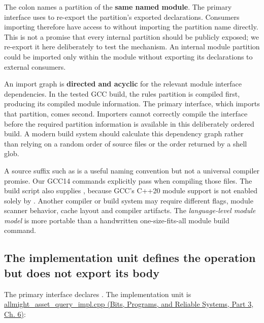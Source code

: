 The colon names a partition of the \textbf{same named module}. The primary interface uses  to re-export the partition's exported declarations. Consumers importing  therefore have access to  without importing the partition name directly. This is not a promise that every internal partition should be publicly exposed; we re-export it here deliberately to test the mechanism. An internal module partition could be imported only within the module without exporting its declarations to external consumers.

An import graph is \textbf{directed and acyclic} for the relevant module interface dependencies. In the tested GCC build, the rules partition is compiled first, producing its compiled module information. The primary interface, which imports that partition, comes second. Importers cannot correctly compile the interface before the required partition information is available in this deliberately ordered build. A modern build system should calculate this dependency graph rather than relying on a random order of source files or the order returned by a shell glob.

A source suffix such as  is a useful naming convention but not a universal compiler promise. Our GCC14 commands explicitly pass  when compiling those files. The build script also supplies , because GCC's C++20 module support is not enabled solely by . Another compiler or build system may require different flags, module scanner behavior, cache layout and compiler artifacts. The \emph{language-level module model} is more portable than a handwritten one-size-fits-all module build command.

\subsection{The implementation unit defines the operation but does not export its body}\label{05-engine-i-ch006-the-implementation-unit-defines-the-operation-but-does-not-export-its-body}

\hypertarget{05-engine-i-ch006-the-implementation-unit-defines-the-operation-but-does-not-export-its-body}{}

The primary interface declares . The implementation unit is \href{../01-Bits-Programs-and-Reliable-Systems-P03/main.pdf\#nameddest=source-file-26fa02737266a08f013cdbb5}{allmight\_asset\_query\_impl.cpp (Bits, Programs, and Reliable Systems, Part 3, Ch. 6)}:

